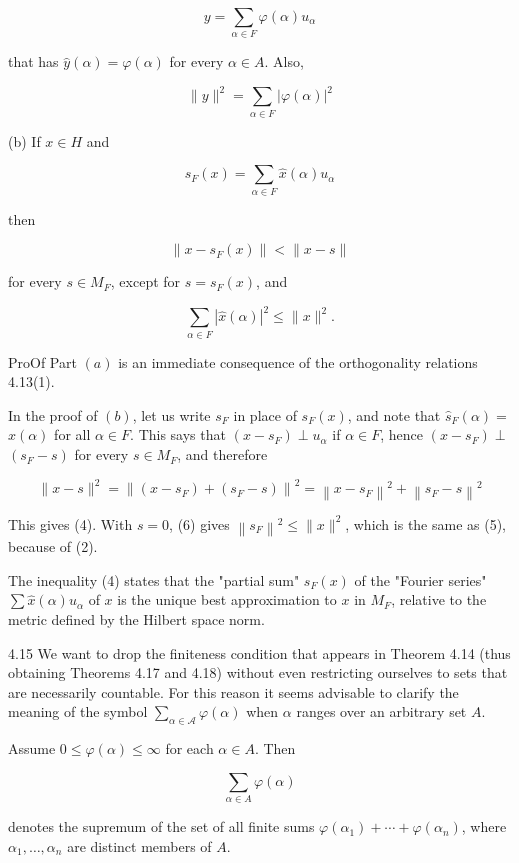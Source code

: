\documentclass[10pt]{article}
\begin{document}
$$
y=\sum_{\alpha \in F} \varphi(\alpha) u_{\alpha}
$$

that has $\hat{y}(\alpha)=\varphi(\alpha)$ for every $\alpha \in A$. Also,

$$
\|y\|^{2}=\sum_{\alpha \in F}|\varphi(\alpha)|^{2}
$$

(b) If $x \in H$ and

$$
s_{F}(x)=\sum_{\alpha \in F} \hat{x}(\alpha) u_{\alpha}
$$

then

$$
\left\|x-s_{F}(x)\right\|<\|x-s\|
$$

for every $s \in M_{F}$, except for $s=s_{F}(x)$, and

$$
\sum_{\alpha \in F}|\hat{x}(\alpha)|^{2} \leq\|x\|^{2} .
$$

ProOf Part $(a)$ is an immediate consequence of the orthogonality relations 4.13(1).

In the proof of $(b)$, let us write $s_{F}$ in place of $s_{F}(x)$, and note that $\hat{s}_{F}(\alpha)=$ $\hat{x}(\alpha)$ for all $\alpha \in F$. This says that $\left(x-s_{F}\right) \perp u_{\alpha}$ if $\alpha \in F$, hence $\left(x-s_{F}\right) \perp$ $\left(s_{F}-s\right)$ for every $s \in M_{F}$, and therefore

$$
\|x-s\|^{2}=\left\|\left(x-s_{F}\right)+\left(s_{F}-s\right)\right\|^{2}=\left\|x-s_{F}\right\|^{2}+\left\|s_{F}-s\right\|^{2}
$$

This gives (4). With $s=0$, (6) gives $\left\|s_{F}\right\|^{2} \leq\|x\|^{2}$, which is the same as (5), because of (2).

The inequality (4) states that the "partial sum" $s_{F}(x)$ of the "Fourier series" $\sum \hat{x}(\alpha) u_{\alpha}$ of $x$ is the unique best approximation to $x$ in $M_{F}$, relative to the metric defined by the Hilbert space norm.

4.15 We want to drop the finiteness condition that appears in Theorem 4.14 (thus obtaining Theorems 4.17 and 4.18) without even restricting ourselves to sets that are necessarily countable. For this reason it seems advisable to clarify the meaning of the symbol $\sum_{\alpha \in \mathcal{A}} \varphi(\alpha)$ when $\alpha$ ranges over an arbitrary set $A$.

Assume $0 \leq \varphi(\alpha) \leq \infty$ for each $\alpha \in A$. Then

$$
\sum_{\alpha \in A} \varphi(\alpha)
$$

denotes the supremum of the set of all finite sums $\varphi\left(\alpha_{1}\right)+\cdots+\varphi\left(\alpha_{n}\right)$, where $\alpha_{1}, \ldots, \alpha_{n}$ are distinct members of $A$.
\end{document}

